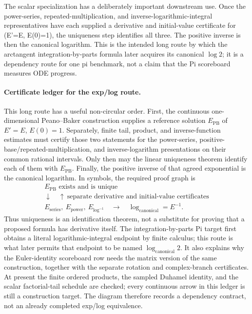 The scalar specialization has a deliberately important downstream use.  Once
the power-series, repeated-multiplication, and inverse-logarithmic-integral
representatives have each supplied a derivative and initial-value certificate
for (E'=E, E(0)=1), the uniqueness step identifies all three.  The positive
inverse is then the canonical logarithm.  This is the intended long route by
which the arctangent integration-by-parts formula later acquires its canonical
\(\log 2\); it is a dependency route for one pi benchmark, not a claim that
the Pi scoreboard measures ODE progress.

\paragraph{Certificate ledger for the exp/log route.}
This long route has a useful non-circular order.  First, the continuous
one-dimensional Peano--Baker construction supplies a reference solution
\(E_{\mathrm{PB}}\) of \(E'=E\), \(E(0)=1\).  Separately, finite tail,
product, and inverse-function estimates must certify those two statements for
the power-series, positive-base/repeated-multiplication, and inverse-logarithm
presentations on their common rational intervals.  Only then may the linear
uniqueness theorem identify each of them with \(E_{\mathrm{PB}}\).  Finally,
the positive inverse of that agreed exponential is the canonical logarithm.
In symbols, the required proof graph is
\[
 \begin{array}{c}
  E_{\mathrm{PB}}\text{ exists and is unique}\\[-2pt]
  \downarrow\quad\uparrow\ \text{separate derivative and initial-value certificates}\\[-2pt]
  E_{\mathrm{series}},\ E_{\mathrm{power}},\ E_{\log^{-1}}
  \quad\longrightarrow\quad \log_{\mathrm{canonical}}=E^{-1}.
 \end{array}
\]
Thus uniqueness is an identification theorem, not a substitute for proving
that a proposed formula has derivative itself.  The integration-by-parts
Pi target first obtains a literal logarithmic-integral endpoint by finite
calculus; this route is what later permits that endpoint to be named
\(\log_{\mathrm{canonical}}2\).  It also explains why the Euler-identity
scoreboard row needs the matrix version of the same construction, together
with the separate rotation and complex-branch certificates.  At present the
finite ordered products, the sampled Duhamel identity, and the scalar
factorial-tail schedule are checked; every continuous arrow in this ledger is
still a construction target.  The diagram therefore records a dependency
contract, not an already completed exp/log equivalence.

